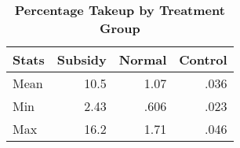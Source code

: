 

\begin{table}[htbp]\centering
\caption{\label{} 
\textbf{Percentage Takeup by Treatment Group} }\begin{tabular} {@{} l r r r @{}} \\ \hline\textbf{   Stats } & \textbf{   Subsidy} & \textbf{    Normal} & \textbf{   Control} \\
\hline
Mean  & 10.5 & 1.07 & .036 \\
Min  & 2.43 & .606 & .023 \\
Max  & 16.2 & 1.71 & .046 \\
\hline
\end{tabular}
\end{table}



